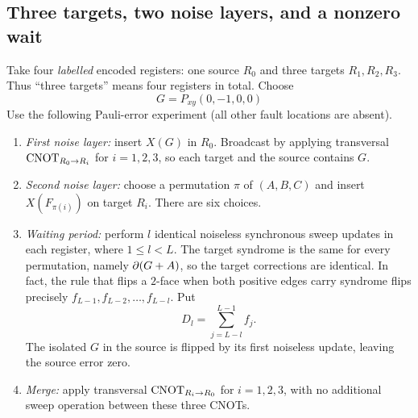 \documentclass[manuscript,screen,review]{acmart}
\begin{document}
\subsection{Three targets, two noise layers, and a nonzero wait}
Take four \emph{labelled} encoded registers: one source $R_0$ and three targets $R_1,R_2,R_3$. Thus ``three targets'' means four registers in total. Choose
\[
 G=P_{xy}(0,-1,0,0)
\]
Use the following Pauli-error experiment (all other fault locations are absent).

\begin{enumerate}
\item \emph{First noise layer:} insert $X(G)$ in $R_0$. Broadcast by applying transversal $\operatorname{CNOT}_{R_0\to R_i}$ for $i=1,2,3$, so each target and the source contains $G$.
\item \emph{Second noise layer:} choose a permutation $\pi$ of $(A,B,C)$ and insert $X(F_{\pi(i)})$ on target $R_i$. There are six choices.
\item \emph{Waiting period:} perform $l$ identical noiseless synchronous sweep updates in each register, where $1\le l<L$. The target syndrome is the same for every permutation, namely $\partial(G+A)$, so the target corrections are identical. In fact, the rule that flips a $2$-face when both positive edges carry syndrome flips precisely $f_{L-1},f_{L-2},\ldots,f_{L-l}$. Put
\[
 D_l=\sum_{j=L-l}^{L-1}f_j.
\]
The isolated $G$ in the source is flipped by its first noiseless update, leaving the source error zero.
\item \emph{Merge:} apply transversal $\operatorname{CNOT}_{R_i\to R_0}$ for $i=1,2,3$, with no additional sweep operation between these three CNOTs.
\end{enumerate}
\end{document}
